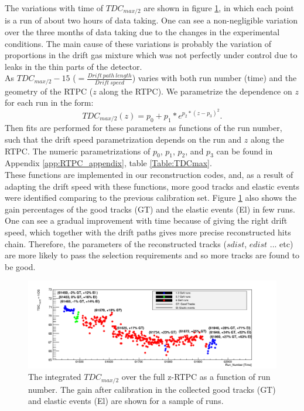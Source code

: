 The variations with time of $TDC_{max/2}$ are shown in figure \ref{fig:Drift_run_number}, in which each point is a run of about two hours of data taking. One can see a non-negligible variation over the three months of data taking due to the changes in the experimental conditions. The main cause of these variations is probably the variation of proportions in the drift gas mixture which was not perfectly under control due to leaks in the thin parts of the detector.\\

As $TDC_{max/2} -15 $ ($= 
\frac{Drift~path~length}{Drift~speed}$) varies with both run number (time) and 
the geometry of the RTPC ($z$ along the RTPC). We
parametrize the dependence on $z$ for each run in the form:\\
\begin{equation}
TDC_{max/2} (z)= p_{0} +  p_{1} * e^{p_{2}*(z-p_{3})^{2}}.
\label{equ:drift_speed_fit}
\end{equation}
Then fits are performed for these parameters as functions of the run number, such that the drift speed parametrization depends on the run and $z$ along the RTPC. The numeric parametrizations of $p_{0}$, $p_{1}$, $p_{2}$, and $p_{3}$ can be found in Appendix \ref{app:RTPC_appendix}, table \ref{Table:TDCmax}. \\

These functions are implemented in our reconstruction codes, and, as a result 
of adapting the drift speed with these functions, more good tracks and elastic 
events were identified comparing to the previous calibration set. Figure 
\ref{fig:Drift_run_number} also shows the gain percentages of the good tracks 
(GT) and the elastic events (El) in few runs. One can see a gradual improvement 
with time because of giving the right drift speed, which together with the 
drift paths gives more precise reconstructed hits chain. Therefore, the 
parameters of the reconstructed tracks ($sdist$, $edist$ ... etc) are more likely to pass the 
selection requirements and so more tracks are found to be good. \\


\begin{figure}[tp]
\hspace{-0.3in}
\includegraphics[scale=0.45]{fig_rtpc/Drift_run_number.png}
\caption{ The integrated $TDC_{max/2}$ over the full z-RTPC as a function of 
run number.  The gain after calibration in the collected good tracks (GT) and 
elastic events (El) are shown for a sample of runs.}
\label{fig:Drift_run_number}
\end{figure} 


